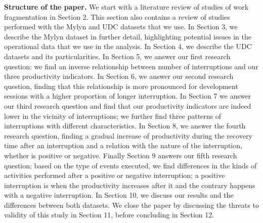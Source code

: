 \documentclass[times]{smrauth}
\begin{document}
\textbf{Structure of the paper.} We start with a literature review of studies of work fragmentation in Section 2. This section also contains a review of studies performed with the Mylyn and UDC datasets that we use. In Section 3, we describe the Mylyn dataset in further detail, highlighting potential issues in the operational data that we use in the analysis. In Section 4, we describe the UDC datasets and its particularities. In Section 5, we answer our first research question: we find an inverse relationship between number of interruptions and our three productivity indicators. In Section 6, we answer our second research question, finding that this relationship is more pronounced for development sessions with a higher proportion of longer interruption. In Section 7 we answer our third research question and find that our productivity indicators are indeed lower in the vicinity of interruptions; we further find three patterns of interruptions with different characteristics. In Section 8, we answer the fourth research question, finding a gradual increase of productivity during the recovery time after an interruption and a relation with the nature of the interruption, whether is positive or negative. Finally Section 9 answers our fifth research question; based on the type of events executed, we find differences in the kinds of activities performed after a positive or negative interruption; a positive interruption is when the productivity increases after it and the contrary happens with a negative interruption. In Section 10, we discuss our results and the differences between both datasets. We close the paper by discussing the threats to validity of this study in Section 11, before concluding in Section 12.
\end{document}
